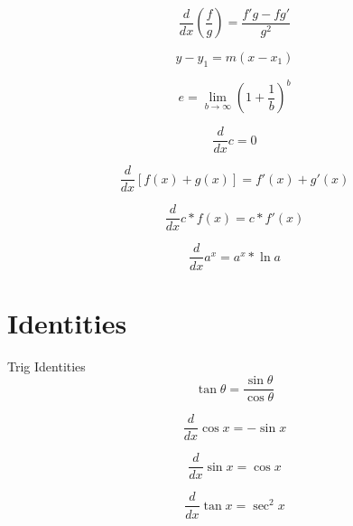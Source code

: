 \documentclass[12pt, english]{article}
\begin{document}
\noindent
{}
\begin{equation}
	\frac{d}{dx} \left(\frac{f}{g}\right) = \frac{f'g - fg'}{g^2}
\end{equation}

\noindent
{}
\begin{equation}
	y-y_1 = m(x-x_1) 
\end{equation}

\noindent
{}
\begin{equation}
	e = \lim_{b \to \infty} (1+\frac{1}{b})^b 
\end{equation}

\noindent
{}
\begin{equation}
	\frac{d}{dx} c = 0 
\end{equation}

\noindent
{}
\begin{equation}
	\frac{d}{dx} [f(x)+g(x)] = f'(x)+g'(x) 
\end{equation}

\noindent
{}
\begin{equation}
	\frac{d}{dx} c * f(x) = c * f'(x) 
\end{equation}

\noindent
{}
\begin{equation}
	\frac{d}{dx} a^x = a^x * \ln a
\end{equation}

\section{Identities}
Trig Identities
\begin{equation}
	\tan \theta = \frac{\sin \theta}{\cos \theta}
\end{equation}

\noindent
{}
\begin{equation}
	\frac{d}{dx} \cos x = -\sin x
\end{equation}

\noindent
{}
\begin{equation}
	\frac{d}{dx} \sin x = \cos x
\end{equation}

\noindent
{}
\begin{equation}
	\frac{d}{dx} \tan x = \sec^2 x
\end{equation}
\end{document}

